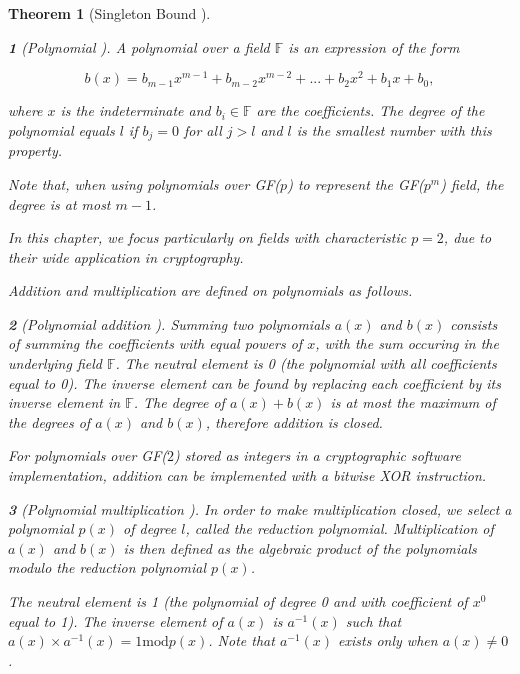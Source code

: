\documentclass{report}
\newtheorem{theorem}{Theorem}{\bfseries}{\itshape}
\newtheorem*{concept}{}{\bfseries}{\itshape}
\begin{document}
\begin{theorem}[Singleton Bound \cite{SloaneBook}]
\begin{concept}[Polynomial \cite{DesignOfRijndael2002}]
A polynomial over a field $\mathbb{F}$ is an expression of the form

$$
b(x) = b_{m-1}x^{m-1} + b_{m-2}x^{m-2} + ... + b_2x^2 + b_1x + b_0,
$$

where $x$ is the \emph{indeterminate} and $b_i \in \mathbb{F}$ are the coefficients. The \emph{degree} of the polynomial equals $l$ if $b_j = 0$ for all $j > l$ and $l$ is the smallest number with this property.
\end{concept}

Note that, when using polynomials over GF($p$) to represent the GF($p^m$) field, the degree is at most $m-1$.

In this chapter, we focus particularly on fields with characteristic $p = 2$, due to their wide application in cryptography.

Addition and multiplication are defined on polynomials as follows.

\begin{concept}[Polynomial addition \cite{DesignOfRijndael2002}]
Summing two polynomials $a(x)$ and $b(x)$ consists of summing the coefficients with equal powers of $x$, with the sum occuring in the underlying field $\mathbb{F}$. The neutral element is 0 (the polynomial with all coefficients equal to 0). The inverse element can be found by replacing each coefficient by its inverse element in $\mathbb{F}$. The degree of $a(x) + b(x)$ is at most the maximum of the degrees of $a(x)$ and $b(x)$, therefore addition is closed.
\end{concept}

For polynomials over GF($2$) stored as integers in a cryptographic software implementation, addition can be implemented with a bitwise XOR instruction.

\begin{concept}[Polynomial multiplication \cite{DesignOfRijndael2002}]
In order to make multiplication closed, we select a polynomial $p(x)$ of degree $l$, called the \emph{reduction polynomial}. Multiplication of $a(x)$ and $b(x)$ is then defined as the algebraic product of the polynomials modulo the reduction polynomial $p(x)$.

The neutral element is 1 (the polynomial of degree 0 and with coefficient of $x^0$ equal to 1). The inverse element of $a(x)$ is $a^{-1}(x)$ such that $a(x) \times a^{-1}(x) = 1 \text{mod} p(x)$. Note that $a^{-1}(x)$ exists only when $a(x) \neq 0$.
\end{concept}


\end{theorem}
\end{document}
